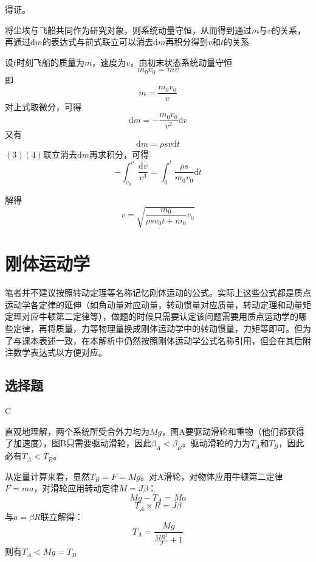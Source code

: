 \documentclass[b5paper,opensource]{qyxf-book}
\newcommand{\di}[1]{\mathrm{d}#1}
\begin{document}
得证。


\analysis 将尘埃与飞船共同作为研究对象，则系统动量守恒，从而得到通过$m$与$v$的关系，再通过$\di m$的表达式与前式联立可以消去$\di m$再积分得到$v$和$t$的关系
			
\solve 设$t$时刻飞船的质量为$m$，速度为$v$。由初末状态系统动量守恒
\begin{equation*}
m_0 v_0=mv
\end{equation*}
即
\begin{equation*}
m=\frac{m_0 v_0}{v}
\end{equation*}
对上式取微分，可得
\begin{equation}
\di m=- \frac{m_0 v_0}{v^2} \di v
\end{equation}
又有
\begin{equation}
\di m=\rho sv\di t
\end{equation}
$(3)(4)$联立消去$\di m$再求积分，可得
\begin{equation*}
-\int_{v_0}^v \frac{\di v}{v^3}=\int_0^t \frac{\rho s}{m_0 v_0} \di t
\end{equation*}

解得
\begin{equation*}
v=\sqrt{\frac{m_0}{\rho sv_0 t+m_0}v_0}
\end{equation*}

\chapter{刚体运动学}
\note 笔者并不建议按照转动定理等名称记忆刚体运动的公式。实际上这些公式都是质点运动学各定律的延伸（如角动量对应动量，转动惯量对应质量，转动定理和动量矩定理对应牛顿第二定律等），做题的时候只需要认定该问题需要用质点运动学的哪些定律，再将质量，力等物理量换成刚体运动学中的转动惯量，力矩等即可。但为了与课本表述一致，在本解析中仍然按照刚体运动学公式名称引用，但会在其后附注数学表达式以方便对应。

\section{选择题}
C

直观地理解，两个系统所受合外力均为$ Mg $，图A要驱动滑轮和重物（他们都获得了加速度），图B只需要驱动滑轮，因此$ \beta_A<\beta_B $。驱动滑轮的力为$ T_A $和$ T_B $，因此必有$ T_A<T_B $。

从定量计算来看，显然$ T_B=F=Mg $。对A滑轮，对物体应用牛顿第二定律$F=ma$，对滑轮应用转动定律$M=J\beta$：
\[Mg-T_A=Ma\]
			\[T_A\times R=J\beta\]
与$ a=\beta R $联立解得：
\[T_A=\frac{Mg}{\frac{MR^2}{J}+1}\]
则有$ T_A< Mg=T_B$
\end{document}
